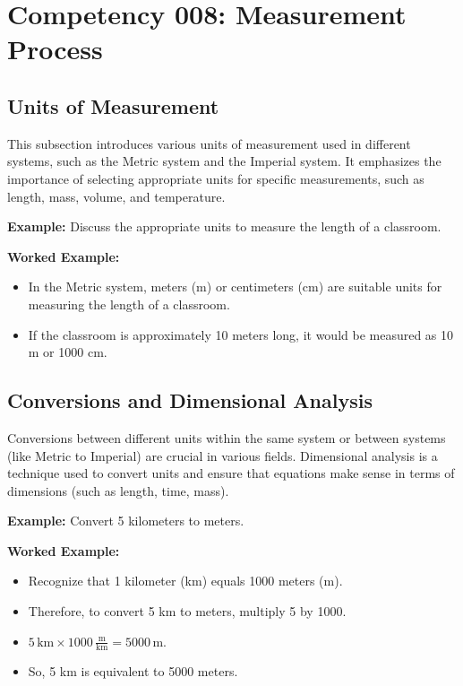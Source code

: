 \documentclass{book}
\begin{document}
\section{Competency 008: Measurement Process}


\subsection{Units of Measurement}
This subsection introduces various units of measurement used in different systems, such as the Metric system and the Imperial system. It emphasizes the importance of selecting appropriate units for specific measurements, such as length, mass, volume, and temperature.


\textbf{Example:} Discuss the appropriate units to measure the length of a classroom.


\textbf{Worked Example:}
\begin{itemize}
        \item In the Metric system, meters (m) or centimeters (cm) are suitable units for measuring the length of a classroom.
        \item If the classroom is approximately 10 meters long, it would be measured as 10 m or 1000 cm.
\end{itemize}


\subsection{Conversions and Dimensional Analysis}
Conversions between different units within the same system or between systems (like Metric to Imperial) are crucial in various fields. Dimensional analysis is a technique used to convert units and ensure that equations make sense in terms of dimensions (such as length, time, mass).


\textbf{Example:} Convert 5 kilometers to meters.


\textbf{Worked Example:}
\begin{itemize}
        \item Recognize that 1 kilometer (km) equals 1000 meters (m).
        \item Therefore, to convert 5 km to meters, multiply 5 by 1000.
        \item \( 5 \, \text{km} \times 1000 \, \frac{\text{m}}{\text{km}} = 5000 \, \text{m} \).
        \item So, 5 km is equivalent to 5000 meters.
\end{itemize}
\end{document}
